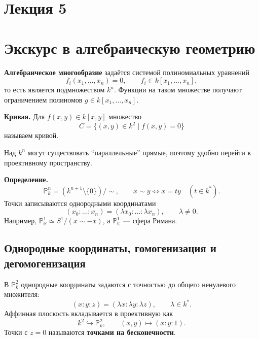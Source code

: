 \documentclass[12pt,a4paper]{article}
\newcommand{\PP}{\mathbb P}
\begin{document}
\section*{\centering Лекция 5}
\section{Экскурс в алгебраическую геометрию}

\textbf{Алгебраическое многообразие} задаётся системой полиномиальных уравнений
\[
f_i(x_1,\ldots,x_n)=0,\qquad f_i\in k[x_1,\ldots,x_n],
\]
то есть является подмножеством $k^n$. Функции на таком множестве получают ограничением полиномов $g\in k[x_1,\ldots,x_n]$.

\textbf{Кривая.} Для $f(x,y)\in k[x,y]$ множество
\[
C=\{(x,y)\in k^2\mid f(x,y)=0\}
\]
называем кривой.

Над $k^n$ могут существовать ``параллельные'' прямые, поэтому удобно перейти к проективному пространству.

\textbf{Определение.}
\[
\PP_k^n=(k^{n+1}\setminus\{0\})/{\sim},\qquad
x\sim y\Longleftrightarrow x=ty\quad(t\in k^*).
\]
Точки записываются однородными координатами
\[
(x_0:\ldots:x_n)=(\lambda x_0:\ldots:\lambda x_n),\qquad \lambda\ne0.
\]
Например, $\PP^1_{\mathbb R}\simeq S^1/(x\sim-x)$, а $\PP^1_{\mathbb C}$ --- сфера Римана.

\begin{center}
\end{center}

\subsection*{Однородные координаты, гомогенизация и дегомогенизация}
В $\PP_k^2$ однородные координаты задаются с точностью до общего ненулевого множителя:
\[
(x:y:z)=(\lambda x:\lambda y:\lambda z),\qquad \lambda\in k^*.
\]
Аффинная плоскость вкладывается в проективную как
\[
k^2\hookrightarrow\PP_k^2,\qquad (x,y)\longmapsto(x:y:1).
\]
Точки с $z=0$ называются \textbf{точками на бесконечности}.
\end{document}
